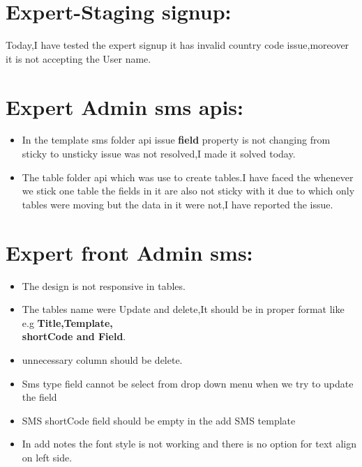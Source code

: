 \documentclass[12pt,a4paper]{article}
\begin{document}
	
 
 \clearpage
\section{Expert-Staging signup:}
Today,I have tested the expert signup it has invalid country code issue,moreover it is not accepting the User name.
\section{Expert Admin sms apis:}
\begin{itemize}
    \item In the template sms folder api issue \textbf{field} property is not changing from sticky to unsticky issue was not resolved,I made it solved today.
    \item The table folder api which was use to create tables.I have faced the whenever we stick one table the fields in it are also not sticky with it due to which only tables were moving but the data in it were not,I have reported the issue.
\end{itemize}
\section{Expert front Admin sms:}
\begin{itemize}
    \item The design is not responsive in tables.
    \item The tables name were Update and delete,It should be in proper format like e.g \textbf{Title,Template,\\shortCode and Field}.
    \item unnecessary column should be delete.
    \item Sms type field cannot be select from drop down menu when we try to update the field
    \item SMS shortCode field should be empty in the add SMS template
    \item  In add notes the font style is not working and there is no option for text align on left side.
    
\end{itemize}
\end{document}
